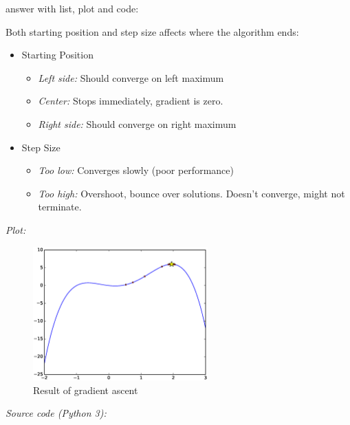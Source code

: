 \documentclass{article}           %
\begin{document}
answer with list, plot and code:

Both starting position and step size affects where the algorithm ends:
\begin{itemize}
    \item Starting Position
    \begin{itemize}
        \item \emph{Left side:} Should converge on left maximum
        \item \emph{Center:} Stops immediately, gradient is zero.
        \item \emph{Right side:} Should converge on right maximum
    \end{itemize}
    \item Step Size
    \begin{itemize}
        \item \emph{Too low:} Converges slowly (poor performance)
        \item \emph{Too high:} Overshoot, bounce over solutions. Doesn't converge, might not terminate.
    \end{itemize}
\end{itemize}

\emph{Plot:}
\begin{figure}[H]
\begin{center}
\includegraphics[width=0.6\textwidth]{eps/w1e1c.eps}
\caption{Result of gradient ascent}
\label{fig:w1e1c}
\end{center}
\end{figure}

\emph{Source code (Python 3):}
\end{document}
